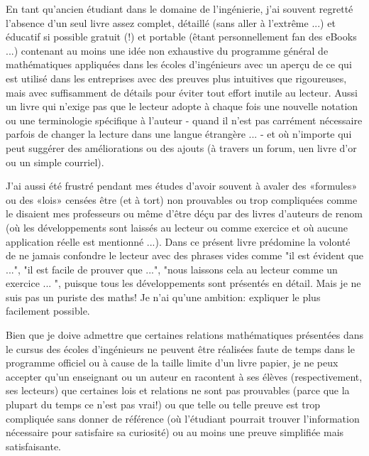 	En tant qu'ancien étudiant dans le domaine de l'ingénierie, j'ai souvent regretté l'absence d'un seul livre assez complet, détaillé (sans aller à l'extrême ...) et éducatif si possible gratuit (!) et portable (êtant personnellement fan des eBooks ...) contenant au moins une idée non exhaustive du programme général de mathématiques appliquées dans les écoles d'ingénieurs avec un aperçu de ce qui est utilisé dans les entreprises avec des preuves plus intuitives que rigoureuses, mais avec suffisamment de détails pour éviter tout effort inutile au lecteur. Aussi un livre qui n'exige pas que le lecteur adopte à chaque fois une nouvelle notation ou une terminologie spécifique à l'auteur - quand il n'est pas carrément nécessaire parfois de changer la lecture dans une langue étrangère ... - et où n'importe qui peut suggérer des améliorations ou des ajouts (à travers un forum, uen livre d'or ou un simple courriel).

	J'ai aussi été frustré pendant mes études d'avoir souvent à avaler des «formules» ou des «lois» censées être (et à tort) non prouvables ou trop compliquées comme le disaient mes professeurs ou même d'être déçu par des livres d'auteurs de renom (où les développements sont laissés au lecteur ou comme exercice et où aucune application réelle est mentionné ...). Dans ce présent livre prédomine la volonté de ne jamais confondre le lecteur avec des phrases vides comme "il est évident que ...", "il est facile de prouver que ...", "nous laissons cela au lecteur comme un exercice ... ", puisque tous les développements sont présentés en détail. Mais je ne suis pas un puriste des maths! Je n'ai qu'une ambition: expliquer le plus facilement possible.
	
	Bien que je doive admettre que certaines relations mathématiques présentées dans le cursus des écoles d'ingénieurs ne peuvent être réalisées faute de temps dans le programme officiel ou à cause de la taille limite d'un livre papier, je ne peux accepter qu'un enseignant ou un auteur en racontent à ses élèves (respectivement, ses lecteurs) que certaines lois et relations ne sont pas prouvables (parce que la plupart du temps ce n'est pas vrai!) ou que telle ou telle preuve est trop compliquée sans donner de référence (où l'étudiant pourrait trouver l'information nécessaire pour satisfaire sa curiosité) ou au moins une preuve simplifiée mais satisfaisante.
	
